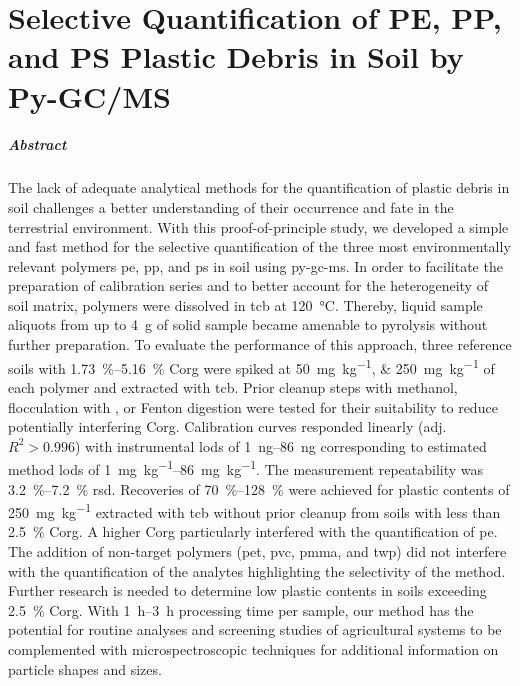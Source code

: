 
\chapter{Selective Quantification of PE, PP, and PS Plastic Debris in Soil by Py-GC/MS}
\label{ch:py-gc-ms-method}

\paragraph{Abstract} The lack of adequate analytical methods for the quantification of plastic debris in soil challenges a better understanding of their occurrence and fate in the terrestrial environment.
With this proof-of-principle study, we developed a simple and fast method for the selective quantification of the three most environmentally relevant polymers \ac{pe}, \ac{pp}, and \ac{ps} in soil using \ac{py-gc-ms}.
In order to facilitate the preparation of calibration series and to better account for the heterogeneity of soil matrix, polymers were dissolved in \ac{tcb} at \SI{120}{\degreeCelsius}. Thereby, liquid sample aliquots from up to \SI{4}{\gram} of solid sample became amenable to pyrolysis without further preparation. To evaluate the performance of this approach, three reference soils with \SIrange{1.73}{5.16}{\percent} \ac{Corg} were spiked at \SIlist{50;250}{\milli\gram\per\kilo\gram} of each polymer and extracted with \ac{tcb}. Prior cleanup steps with methanol, flocculation with , or Fenton digestion were tested for their suitability to reduce potentially interfering \ac{Corg}.
Calibration curves responded linearly (adj. $R^2 > 0.996$) with instrumental \acp{lod} of \SIrange{1}{86}{\nano\gram} corresponding to estimated method \acp{lod} of \SIrange{1}{86}{\milli\gram\per\kilo\gram}. The measurement repeatability was \SIrange{3.2}{7.2}{\percent} \ac{rsd}. Recoveries of \SIrange{70}{128}{\percent} were achieved for plastic contents of \SI{250}{\milli\gram\per\kilo\gram} extracted with \ac{tcb} without prior cleanup from soils with less than \SI{2.5}{\percent} \ac{Corg}. A higher \ac{Corg} particularly interfered with the quantification of \ac{pe}. The addition of non-target polymers (\ac{pet}, \ac{pvc}, \ac{pmma}, and \ac{twp}) did not interfere with the quantification of the analytes highlighting the selectivity of the method. Further research is needed to determine low plastic contents in soils exceeding \SI{2.5}{\percent} \ac{Corg}. With \SIrange{1}{3}{\hour} processing time per sample, our method has the potential for routine analyses and screening studies of agricultural systems to be complemented with microspectroscopic techniques for additional information on particle shapes and sizes.

